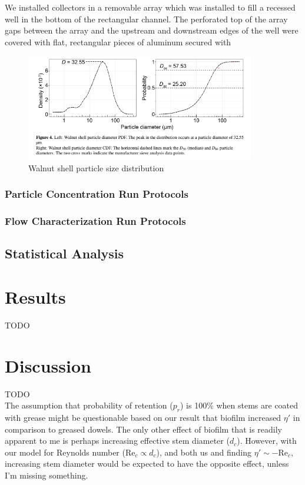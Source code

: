 \documentclass[10pt,a4paper]{article}
\newcommand\Rey{\mathrm{Re}}
\begin{document}
We installed collectors in a removable array which was installed to fill a recessed well in the bottom of the rectangular channel. The perforated top of the array gaps between the array and the upstream and downstream edges of the well were covered with flat, rectangular pieces of aluminum secured with 

\begin{figure}[h]
\includegraphics[width=10cm]{wf5-200sizedist.png}
\centering
\caption{Walnut shell particle size distribution}
\end{figure}

\subsubsection{Particle Concentration Run Protocols}

\subsubsection{Flow Characterization Run Protocols}

\subsection{Statistical Analysis}

\section{Results}

TODO

\section{Discussion}

TODO\\
\hfill\break
The assumption that probability of retention ($p_r$) is 100\% when stems are coated with grease might be questionable based on our result that biofilm increased $\eta\prime$ in comparison to greased dowels. The only other effect of biofilm that is readily apparent to me is perhaps increasing effective stem diameter ($d_c$). However, with our model for Reynolds number ($\Rey_c \propto d_c$), and both us and \citet{Fauria_2015} finding $\eta\prime \sim -\Rey_c$, increasing stem diameter would be expected to have the opposite effect, unless I'm missing something.



\end{document}
